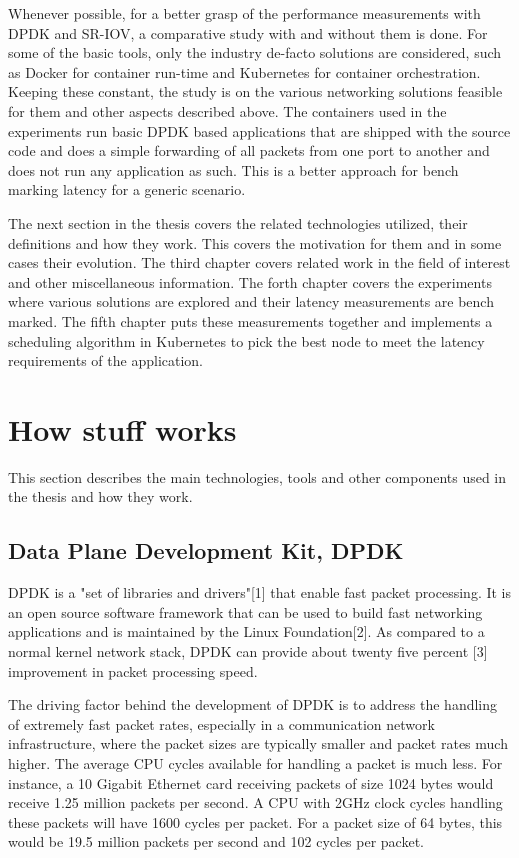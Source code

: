 \documentclass[english, 12pt, a4paper, elec, utf8, a-1b, online]{aaltothesis}
\begin{document}
Whenever possible, for a better grasp of the performance measurements with DPDK and SR-IOV, a comparative study with and without them is done. For some of the basic tools, only the industry de-facto solutions are considered, such as  Docker for container run-time and Kubernetes for container orchestration. Keeping these constant, the study is on the various networking solutions feasible for them and other aspects described above. The containers used in the experiments run basic DPDK based applications that are shipped with the source code and does a simple forwarding of all packets from one port to another and does not run any application as such. This is a better approach for bench marking latency for a generic scenario.

The next section in the thesis covers the related technologies utilized, their definitions and how they work. This covers the motivation for them and in some cases their evolution. The third chapter covers related work in the field of interest and other miscellaneous information. The forth chapter covers the experiments where various solutions are explored and their latency measurements are bench marked. The fifth chapter puts these measurements together and implements a scheduling algorithm in Kubernetes to pick the best node to meet the latency requirements of the application.

\clearpage
\section{How stuff works}
This section describes the main technologies, tools and other components used in the thesis and how they work.
\subsection{Data Plane Development Kit, DPDK}
DPDK is a "set of libraries and drivers"[1] that enable fast packet processing. It is an open source software framework that can be used to build fast networking applications and is maintained by the Linux Foundation[2]. As compared to a normal kernel network stack, DPDK can provide about twenty five percent [3] improvement in packet processing speed.

The driving factor behind the development of DPDK is to address the handling of extremely fast packet rates, especially in a communication network infrastructure, where the packet sizes are typically smaller and packet rates much higher. The average CPU cycles available for handling a packet is much less. For instance, a 10 Gigabit Ethernet card receiving packets of size 1024 bytes would receive 1.25 million packets per second. A CPU with 2GHz clock cycles handling these packets will have 1600 cycles per packet. For a packet size of 64 bytes, this would be 19.5 million packets per second and 102 cycles per packet. 
\end{document}
